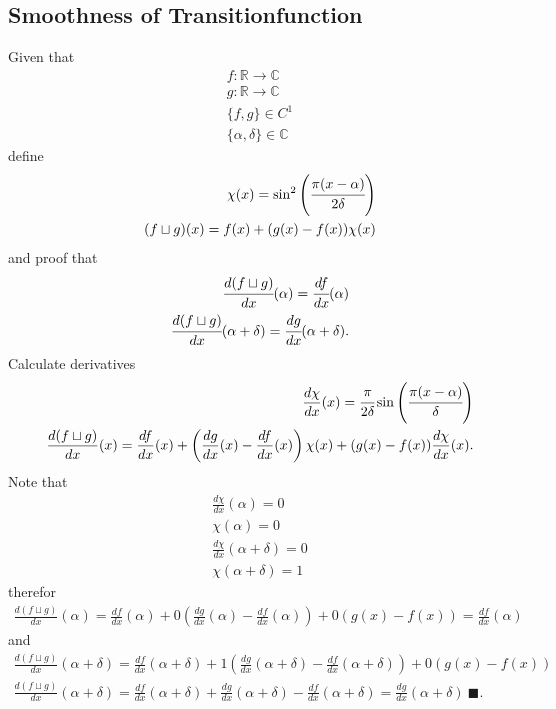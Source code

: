 \documentclass[11pt,DIV=10,final]{scrreprt} %
\newcommand{\deriv}[2]{%
  \frac{d#1}{d#2}
}
\begin{document}
\begin{appendix}
{\subsection{Smoothness of Transitionfunction}\label{proof:joint}
Given that
\begin{align}
  f: \mathbb{R} \rightarrow \mathbb{C} \\
  g: \mathbb{R} \rightarrow \mathbb{C} \\
  \{f, g\} \in C^{1} \\
  \{\alpha, \delta\} \in \mathbb{C}
\end{align}
define \hspace*{\fill}~\citep{hall2013quantum}
\begin{align}
  \chi(x) = \sin^{2}\left(\cfrac{\pi(x - \alpha)}{2\delta}\right) \\
  (f \sqcup g)(x) = f(x) + (g(x) - f(x)) \chi(x)
\end{align}
and proof that
\begin{align}
  \label{eq:deriv-f}
  \cfrac{d(f \sqcup g)}{dx}(\alpha) = \cfrac{df}{dx}(\alpha) \\
  \label{eq:deriv-g}
  \cfrac{d(f \sqcup g)}{dx}(\alpha + \delta) = \cfrac{dg}{dx}(\alpha + \delta).
\end{align}
Calculate derivatives
\begin{align}
  \deriv{\chi}{x}(x) = \cfrac{\pi}{2 \delta} \sin\left(\cfrac{\pi (x - \alpha)}{\delta}\right)\\
  \deriv{(f \sqcup g)}{x}(x) = \deriv{f}{x}(x) + \left(\deriv{g}{x}(x) - \deriv{f}{x}(x)\right)\chi(x) + (g(x) - f(x))\deriv{\chi}{x}(x).
\end{align}
Note that
\begin{align}
  \deriv{\chi}{x}(\alpha) = 0 \\
  \chi(\alpha) = 0 \\
  \deriv{\chi}{x}(\alpha + \delta) = 0 \\
  \chi(\alpha + \delta) = 1
\end{align}
therefor
\begin{align}
  \deriv{(f \sqcup g)}{x}(\alpha) = \deriv{f}{x}(\alpha) + 0 \left(\deriv{g}{x}(\alpha) - \deriv{f}{x}(\alpha)\right) + 0 (g(x) - f(x)) = \deriv{f}{x}(\alpha)
\end{align}
and
\begin{align}
  \deriv{(f \sqcup g)}{x}(\alpha + \delta) = \deriv{f}{x}(\alpha + \delta) + 1 \left(\deriv{g}{x}(\alpha + \delta) - \deriv{f}{x}(\alpha + \delta)\right) + 0 (g(x) - f(x)) \\
  \deriv{(f \sqcup g)}{x}(\alpha + \delta) = \deriv{f}{x}(\alpha + \delta) + \deriv{g}{x}(\alpha + \delta) - \deriv{f}{x}(\alpha + \delta) = \deriv{g}{x}(\alpha + \delta)~\blacksquare.
\end{align}

}
\end{appendix}
\end{document}
